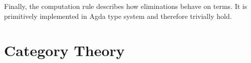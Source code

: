 \begin{code}%
\>[0]\<%
\\
\>[0]\AgdaSpace{}%
\AgdaSymbol{:}\AgdaSpace{}%
\AgdaSpace{}%
\AgdaSymbol{\{}\AgdaSpace{}%
\AgdaSpace{}%
\AgdaSymbol{\}}\<%
\\
\>[0][@{}l@{\AgdaIndent{0}}]%
\>[2]\AgdaSpace{}%
\AgdaSpace{}%
\AgdaSpace{}%
\AgdaSpace{}%
\AgdaSpace{}%
\AgdaSpace{}%
\AgdaSpace{}%
\<%
\\
\>[0]\AgdaSpace{}%
\AgdaSymbol{=}\AgdaSpace{}%
\<%
\\
%
\\[\AgdaEmptyExtraSkip]%
\>[0]\AgdaSpace{}%
\AgdaSymbol{:}\AgdaSpace{}%
\AgdaSpace{}%
\AgdaSymbol{\{}\AgdaSpace{}%
\AgdaSpace{}%
\AgdaSpace{}%
\AgdaSymbol{\}}\<%
\\
\>[0][@{}l@{\AgdaIndent{0}}]%
\>[2]\AgdaSpace{}%
\AgdaSpace{}%
\AgdaSpace{}%
\AgdaSpace{}%
\AgdaSpace{}%
\AgdaSymbol{(}\AgdaSpace{}%
\AgdaSymbol{)}\AgdaSpace{}%
\AgdaSpace{}%
\AgdaSpace{}%
\AgdaSpace{}%
\AgdaSymbol{(}\AgdaSpace{}%
\AgdaSpace{}%
\AgdaSpace{}%
\AgdaSpace{}%
\AgdaSymbol{)}\<%
\\
\>[0]\AgdaSpace{}%
\AgdaSymbol{=}\AgdaSpace{}%
\<%
\end{code}

Finally, the computation rule describes how eliminations behave on terms. It is primitively implemented in Agda type system and therefore trivially hold.

\section{Category Theory}